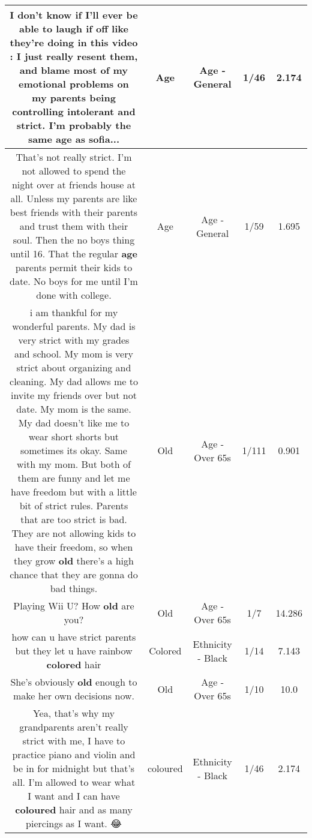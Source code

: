 \documentclass[11pt]{article}
\newlength\mylength
\begin{document}
\begin{center}
\begin{longtable}{|C{.65\mylength}|C{.30\mylength}|C{.12\mylength}|C{.12\mylength}|C{.12\mylength}|}
  \small I don't know if I'll ever be able to laugh if off like they're doing in this video : I just really resent them, and blame most of my emotional problems on my parents being controlling intolerant and strict. I'm probably the same \textbf{age} as sofia...\normalsize   & Age & Age - General & 1/46 & 2.174 \\  \hline
  \small That's not really strict. I'm not allowed to spend the night over at friends house at all. Unless my parents are like best friends with their parents and trust them with their soul. Then the no boys thing until 16. That the regular \textbf{age} parents permit their kids to date. No boys for me until I'm done with college.\normalsize   & Age & Age - General & 1/59 & 1.695 \\  \hline
  \small i am thankful for my wonderful parents. My dad is very strict with my grades and school. My mom is very strict about organizing and cleaning. My dad allows me to invite my friends over but not date. My mom is the same. My dad doesn't like me to wear short shorts but sometimes its okay. Same with my mom. But both of them are funny and let me have freedom but with a little bit of strict rules. Parents that are too strict is bad. They are not allowing kids to have their freedom, so when they grow \textbf{old} there's a high chance that they are gonna do bad things.\normalsize   & Old & Age - Over 65s & 1/111 & 0.901 \\  \hline
  \small Playing Wii U? How \textbf{old} are you?\normalsize   & Old & Age - Over 65s & 1/7 & 14.286 \\  \hline
  \small how can u have strict parents but they let u have rainbow \textbf{colored} hair\normalsize   & Colored & Ethnicity - Black & 1/14 & 7.143 \\  \hline
  \small She's obviously \textbf{old} enough to make her own decisions now.\normalsize   & Old & Age - Over 65s & 1/10 & 10.0 \\  \hline
  \small Yea, that's why my grandparents aren't really strict with me, I have to practice piano and violin and be in for midnight but that's all. I'm allowed to wear what I want and I can have \textbf{coloured} hair and as many piercings as I want. 😂\normalsize   & coloured & Ethnicity - Black & 1/46 & 2.174 \\  \hline

\end{longtable}
\end{center}
\end{document}
